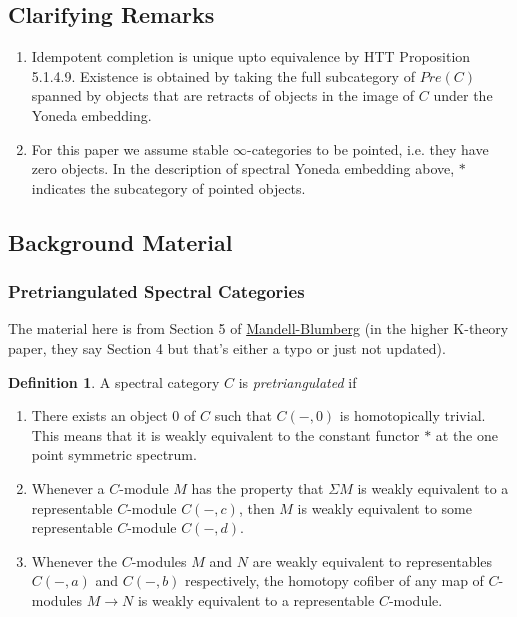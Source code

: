 \documentclass[letterpaper]{article}
\theoremstyle{definition}
\newtheorem{definition}[lemma]{Definition}
\begin{document}
\subsection{Clarifying Remarks}

\begin{enumerate}
\item Idempotent completion is unique upto equivalence by HTT Proposition 5.1.4.9. Existence is obtained by taking the full subcategory of $Pre(C)$ spanned by objects that are retracts of objects in the image of $C$ under the Yoneda embedding.
\item For this paper we assume stable $\infty$-categories to be pointed, i.e. they have zero objects. In the description of spectral Yoneda embedding above, $*$ indicates the subcategory of pointed objects. 
\end{enumerate}

\subsection{Background Material}

\subsubsection{Pretriangulated Spectral Categories}

The material here is from Section 5 of \href{References/LocalizationTHH.pdf}{Mandell-Blumberg} (in the higher K-theory paper, they say Section 4 but that's either a typo or just not updated). 

\begin{definition}
A spectral category $C$ is \textit{pretriangulated} if 
\begin{enumerate}
\item There exists an object 0 of $C$ such that $C(-,0)$ is homotopically trivial. This means that it is weakly equivalent to the constant functor $*$ at the one point symmetric spectrum. 
\item Whenever a $C$-module $M$ has the property that $\Sigma M$ is weakly equivalent to a representable $C$-module $C(-,c)$, then $M$ is weakly equivalent to some representable $C$-module $C(-,d)$.
\item Whenever the $C$-modules $M$ and $N$ are weakly equivalent to representables $C(-,a)$ and $C(-,b)$ respectively, the homotopy cofiber of any map of $C$-modules $M \rightarrow N$ is weakly equivalent to a representable $C$-module.
\end{enumerate}
\end{definition}
\end{document}

